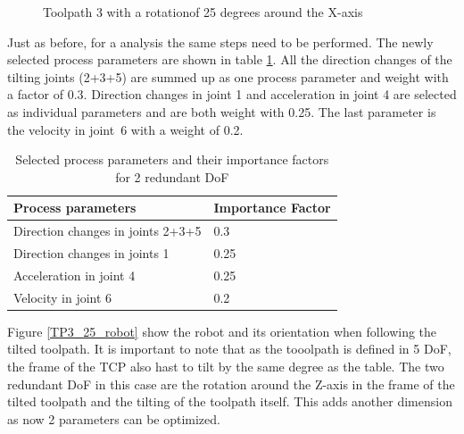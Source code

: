 \begin{figure}[H]
\begin{minipage}{0.5\textwidth}
		\caption{Toolpath 3 with a rotation\newline of 25 degrees around the X-axis}
		\label{TP3_25}
	\end{minipage}\par
\end{figure}
 

Just as before, for a analysis the same steps need to be performed. The newly selected process parameters are shown in table \ref{PP_2}. All the direction changes of the tilting joints (2+3+5) are summed up as one process parameter and weight with a factor of 0.3. Direction changes in joint 1 and acceleration in joint 4 are selected as individual parameters and are both weight with 0.25. The last parameter is the velocity in joint~6 with a weight of 0.2.  
\begin{table}[H]
	\centering
	\begin{tabular}{||l|l||}
		Process parameters& Importance Factor \\
		\hline
		\hline
		\hline
		Direction changes in joints 2+3+5	&		0.3 \\
		Direction changes in joints 1	&  	0.25 \\
		Acceleration in joint 4	& 		0.25\\
		Velocity in joint 6	& 		0.2\\
		\hline
		\hline
	\end{tabular}
	
	\caption{Selected process parameters and their importance factors for 2 redundant DoF}
	\label{PP_2}
\end{table}



\newpage
Figure \ref{TP3_25_robot} show the robot and its orientation when following the tilted toolpath. It is important to note that as the tooolpath is defined in 5 DoF, the frame of the TCP also hast to tilt by the same degree as the table. The two redundant DoF in this case are the rotation around the Z-axis in the frame of the tilted toolpath and the tilting of the toolpath itself. This adds another dimension as now 2 parameters can be optimized.



